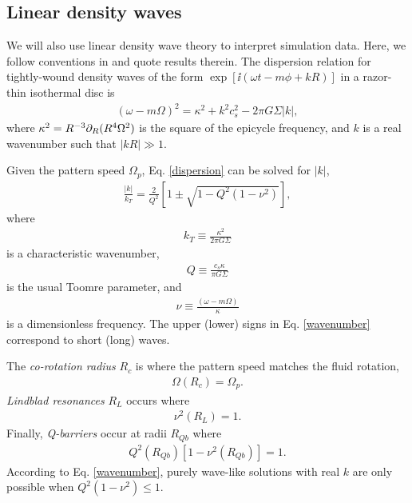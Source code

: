 \subsection{Linear density waves}\label{wkb}
We will also use linear density wave theory to interpret
simulation data. Here, we follow conventions in \cite{shu91} and quote
results therein. The dispersion relation for tightly-wound density
waves of the form 
$\exp{[\ii(\omega t - m \phi + kR)]}$ in a razor-thin
isothermal disc is 
\begin{align}\label{dispersion}
  (\omega - m\Omega)^2 = \kappa^2 + k^2c_s^2 - 2\pi G \Sigma |k|, 
\end{align}
where $\kappa^2 = R^{-3}\partial_R(R^4\Omega^2)$ is the square of the epicycle frequency, 
and $k$ is a real wavenumber such that $|kR|\gg1$. 

Given the pattern speed $\Omega_p$,
Eq. \ref{dispersion} can be solved for $|k|$, 
\begin{align}\label{wavenumber}
  \frac{|k|}{k_T} = \frac{2}{Q^2}\left[1 \pm \sqrt{1 -
      Q^2(1-\nu^2)}\right], 
\end{align}
where 
\begin{align}
  k_T \equiv \frac{\kappa^2}{2\pi G \Sigma}
\end{align}
is a characteristic wavenumber, 
\begin{align}
  Q \equiv \frac{c_s\kappa}{\pi G \Sigma}
\end{align}
is the usual Toomre parameter, and
\begin{align}
  \nu \equiv \frac{(\omega - m\Omega)}{\kappa}
\end{align}
is a dimensionless frequency.  The upper (lower) signs in
Eq. \ref{wavenumber} correspond to short (long) waves.  

The \emph{co-rotation radius} $R_c$ is where the pattern speed matches
the fluid rotation,
\begin{align}
  \Omega(R_c) = \Omega_p.
\end{align}
\emph{Lindblad resonances} $R_L$ occurs where
\begin{align}
  \nu^2(R_L) = 1. 
\end{align}
Finally, \emph{Q-barriers} occur at radii $R_{Qb}$ where
\begin{align}
  Q^2(R_{Qb})\left[1-\nu^2(R_{Qb})\right] = 1.  
\end{align}
According to Eq. \ref{wavenumber}, purely wave-like solutions with
real $k$ are only possible when $Q^2(1-\nu^2)\leq1$.  

